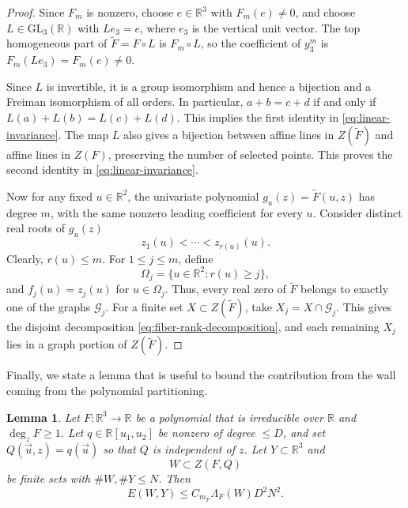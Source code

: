 \documentclass{amsart}%
\numberwithin{equation}{section}
\newtheorem{lemma}[theorem]{Lemma}
\newcommand{\ZR}{\mathbb{R}}
\newcommand{\R}{\mathbb{R}}
\newcommand{\1}{\mathbbm{1}}
\begin{document}
\begin{proof}
Since $F_m$ is nonzero, choose $e\in\R^3$ with $F_m(e)\neq0$, and choose $L\in\mathrm{GL}_3(\R)$ with $Le_3=e$, where $e_3$ is the vertical unit vector. 
The top homogeneous part of $\widetilde F=F\circ L$ is $F_m\circ L$, so the coefficient of $y_3^m$ is $F_m(Le_3)=F_m(e)\neq0$.

Since $L$ is invertible, it is a group isomorphism and hence a bijection and a Freiman isomorphism of all orders.
In particular, $a+b=c+d$ if and only if $L(a)+L(b)=L(c)+L(d)$.
This implies the first identity in \eqref{eq:linear-invariance}. 
The map $L$ also gives a bijection between affine lines in $ Z(\widetilde F)$ and affine lines in $Z(F)$, preserving the number of selected points. 
This proves the second identity in \eqref{eq:linear-invariance}.

\smallskip

Now for any fixed $u\in\R^2$, the univariate polynomial $g_u(z)=\widetilde F(u,z)$ has degree $m$, with the same nonzero leading coefficient for every $u$. 
Consider distinct real roots of $g_u(z)$
\[
    z_1(u)<\cdots<z_{r(u)}(u).
\]
Clearly, $r(u)\leq m$. For $1\leq j\leq m$, define
\[
    \Omega_j=\{u\in\R^2:r(u)\geq j\},
\]
and $f_j(u)=z_j(u)$ for $u\in\Omega_j$. 
Thus, every real zero of $\widetilde F$ belongs to exactly one of the graphs $\mathcal G_j$. 
For a finite set $X\subset Z(\widetilde F)$, take $X_j=X\cap\mathcal G_j$. 
This gives the disjoint decomposition \eqref{eq:fiber-rank-decomposition}, and each remaining $X_j$ lies in a graph portion of $ Z(\widetilde F)$.
\end{proof}

\medskip

Finally, we state a lemma that is useful to bound the contribution from the wall coming from the polynomial partitioning.

\begin{lemma}
\label{lem: wall energy} 
Let $F:\ZR^3\to\ZR$ be a polynomial that is irreducible over $\ZR$ and $\deg_z F\ge 1$. 
Let $q\in\R[u_1,u_2]$ be nonzero of degree $\leq D$,  and set $Q(\vec{u},z)=q(\vec{u})$ so that $Q$ is independent of $z$. 
Let $Y\subset \ZR^3$ and
\[
    W\subset Z(F,Q)
\]
be finite sets with $\#W,\#Y\leq N$. 
Then
\begin{equation}
\label{eq:wall-energy}
    E(W,Y)\leq C_{m_F}\Lambda_{F}(W)D^2N^2.
\end{equation}
\end{lemma}
\end{document}
